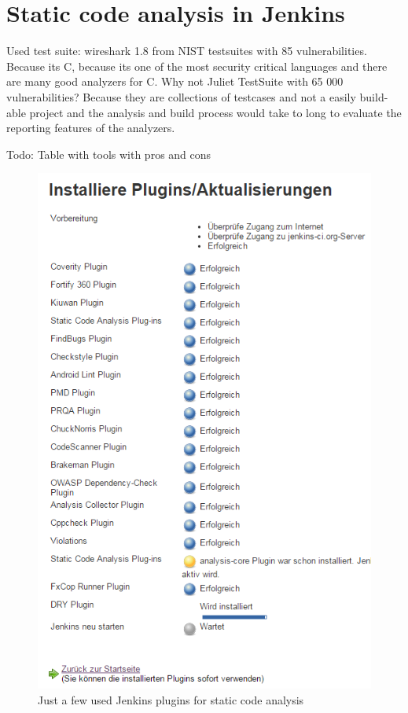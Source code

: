 \documentclass[conference]{IEEEtran}
\begin{document}
\section{Static code analysis in Jenkins}
\label{sec:static_code_analysis_jenkins}
Used test suite: wireshark 1.8 from NIST testsuites with 85 vulnerabilities.
Because its C, because its one of the most security critical languages and there are many good analyzers for C.
Why not Juliet TestSuite with 65 000 vulnerabilities?
Because they are collections of testcases and not a easily build-able project and the analysis and build process would take to long to evaluate the reporting features of the analyzers.


Todo: Table with tools with pros and cons

\begin{figure}[!t]
	\centering
	\includegraphics[width=1\linewidth]{img/jenkins-code-analysis-plugins.png}
	\caption{Just a few used Jenkins plugins for static code analysis}
	\label{fig:jenkins-plugins}
\end{figure}
\end{document}
